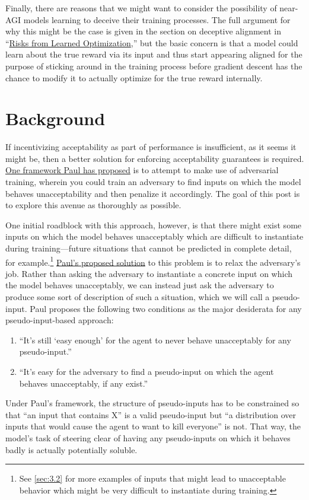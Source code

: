 \documentclass{amsart}
\begin{document}
Finally, there are reasons that we might want to consider the possibility of near-AGI models learning to deceive their training processes. The full argument for why this might be the case is given in the section on deceptive alignment in ``\href{https://arxiv.org/abs/1906.01820}{Risks from Learned Optimization},'' but the basic concern is that a model could learn about the true reward via its input and thus start appearing aligned for the purpose of sticking around in the training process before gradient descent has the chance to modify it to actually optimize for the true reward internally.

\section{Background}

If incentivizing acceptability as part of performance is insufficient, as it seems it might be, then a better solution for enforcing acceptability guarantees is required. \href{https://ai-alignment.com/training-robust-corrigibility-ce0e0a3b9b4d}{One framework Paul has proposed} is to attempt to make use of adversarial training, wherein you could train an adversary to find inputs on which the model behaves unacceptability and then penalize it accordingly. The goal of this post is to explore this avenue as thoroughly as possible.

One initial roadblock with this approach, however, is that there might exist some inputs on which the model behaves unacceptably which are difficult to instantiate during training---future situations that cannot be predicted in complete detail, for example.\footnote{See \autoref{sec:3.2} for more examples of inputs that might lead to unacceptable behavior which might be very difficult to instantiate during training.} \href{https://ai-alignment.com/training-robust-corrigibility-ce0e0a3b9b4d}{Paul's proposed solution} to this problem is to relax the adversary's job. Rather than asking the adversary to instantiate a concrete input on which the model behaves unacceptably, we can instead just ask the adversary to produce some sort of description of such a situation, which we will call a pseudo-input. Paul proposes the following two conditions as the major desiderata for any pseudo-input-based approach:
\begin{enumerate}
    \item ``It's still ‘easy enough' for the agent to never behave unacceptably for any pseudo-input.''
    \item ``It's easy for the adversary to find a pseudo-input on which the agent behaves unacceptably, if any exist.''
\end{enumerate}
Under Paul's framework, the structure of pseudo-inputs has to be constrained so that ``an input that contains X'' is a valid pseudo-input but ``a distribution over inputs that would cause the agent to want to kill everyone'' is not. That way, the model's task of steering clear of having any pseudo-inputs on which it behaves badly is actually potentially soluble.
\end{document}

